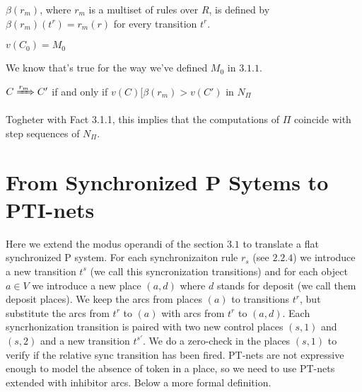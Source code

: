 \begin{definition}
$\beta(r_m)$, where $r_m$ is a multiset of rules over $R$, is defined by 
$\beta(r_m)(t^r)=r_m(r)$ for every transition $t^r$.  
\end{definition}

\begin{fact}[]
$v(C_0)=M_0$
\end{fact}
We know that's true for the way we've defined $M_0$ in \hyperref[def:def_tr_basic]{$3.1.1$}.

\begin{fact}[]
$C \xRightarrow{r_m} C'$ if and only if $v(C)[\beta(r_m)> v(C')$ in $N_\Pi$
\end{fact}

Togheter with Fact 3.1.1, this implies that the computations of $\Pi$ coincide with step sequences of $N_\Pi$. 

\section{From Synchronized P Sytems to PTI-nets}

Here we extend the modus operandi of the section \hyperref[sec:basic_p_to_pt]{$3.1$} to translate 
a flat synchronized P system.
For each synchronizaiton rule $r_s$ (see \hyperref[def:sync_rule]{$2.2.4$}) we introduce a new transition $t^s$ (we call this syncronization transitions) and for each object $a \in V$ we introduce a new place $(a,d)$ where $d$ stands for deposit (we call them deposit places).
We keep the arcs from places $(a)$ to transitions $t^r$, but substitute the arcs from $t^r$ to $(a)$ with arcs from $t^r$ to $(a,d)$.
Each syncrhonization transition is paired with two new control places $(s,1)$ and $(s,2)$ and a new transition $t^{s\prime}$.
We do a zero-check in the places $(s,1)$ to verify if the relative sync transition has been fired.
PT-nets are not expressive enough to model the absence of token in a place, so we need to use PT-nets extended with inhibitor arcs.
Below a more formal definition.

